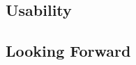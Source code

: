 \documentclass[../ddppaper2.tex]{subfiles}
\begin{document}
\subsection{Usability}
\subsection{Looking Forward}
\end{document}
